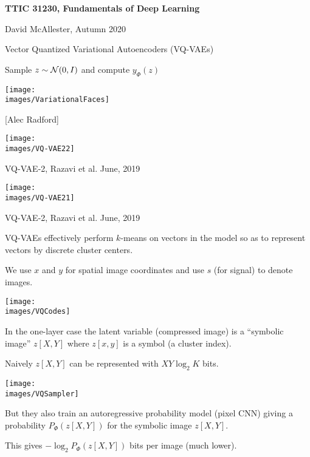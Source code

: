 





{\Huge

  \centerline{\bf TTIC 31230, Fundamentals of Deep Learning}
  \bigskip
  \centerline{David McAllester, Autumn 2020}
  \vfill
  \vfil
  \centerline{Vector Quantized Variational Autoencoders (VQ-VAEs)}
  \vfill
  \vfill
  

\centerline{Sample {\color{red} $z \sim {\cal N}(0,I)$} and compute {\color{red} $y_\Phi(z)$}}

\vfill
\centerline{\texttt{[image: \\images/VariationalFaces]}}
\centerline{[Alec Radford]}


\centerline{\texttt{[image: \\images/VQ-VAE22]}}

\vfill
VQ-VAE-2, Razavi et al. June, 2019


\centerline{\texttt{[image: \\images/VQ-VAE21]}}

\vfill
VQ-VAE-2, Razavi et al. June, 2019


VQ-VAEs effectively perform $k$-means on vectors in the model so as to represent vectors by discrete cluster centers.

\vfill
We use $x$ and $y$ for spatial image coordinates and use $s$ (for signal) to denote images.


\centerline{\texttt{[image: \\images/VQCodes]}}

\vfill
In the one-layer case the latent variable (compressed image) is a ``symbolic image'' $z[X,Y]$ where $z[x,y]$ is a symbol (a cluster index).

\vfill
Naively $z[X,Y]$ can be represented with $XY \log_2 K$ bits.


\centerline{\texttt{[image: \\images/VQSampler]}}

But they also train an autoregressive probability model (pixel CNN) giving a probability $P_\Phi(z[X,Y])$ for the symbolic image $z[X,Y]$.

\vfill
This gives  $-\log_2 P_\Phi(z[X,Y])$ bits per image (much lower).

}
